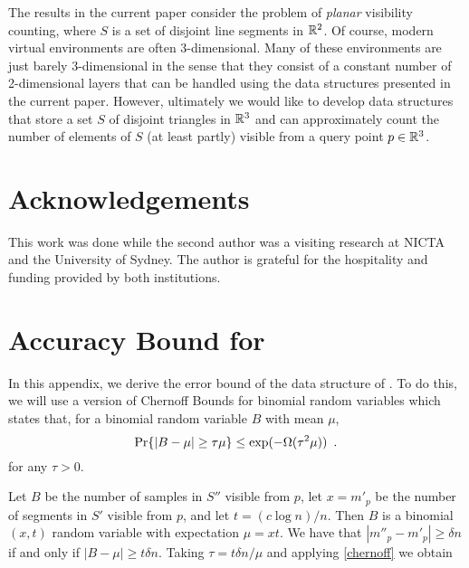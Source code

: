 \documentclass{patmorin}
\begin{document}
The results in the current paper consider the problem of \emph{planar}
visibility counting, where $S$ is a set of disjoint line segments in
$\mathbb{R}^2$.  Of course, modern virtual environments are often 3-dimensional.
Many of these environments are just barely 3-dimensional in the sense
that they consist of a constant number of 2-dimensional layers that can
be handled using the data structures presented in the current paper.
However, ultimately we would like to develop data structures that store
a set $S$ of disjoint triangles in $\mathbb{R}^3$ and can approximately count
the number of elements of $S$ (at least partly) visible from a query
point $p\in \mathbb{R}^3$.


\section*{Acknowledgements}

This work was done while the second author was a visiting research at NICTA
and the University of Sydney.  The author is grateful for the hospitality
and funding provided by both institutions.





\appendix

\section{Accuracy Bound for }

In this appendix, we derive the error bound of the data structure of
.  To do this, we will use a version of Chernoff Bounds
for binomial random variables \cite[Appendix~A.1]{as08} which states
that, for a binomial random variable $B$ with mean $\mu$, 
\begin{equation}  
  \Pr\{|B-\mu| \ge \tau\mu\} 
     \le \exp(-\Omega(\tau^2\mu)) \enspace .
  \eqlabel{chernoff}
\end{equation}
for any $\tau > 0$.

Let $B$ be the number of samples in $S''$ visible from $p$, let $x=m'_p$
be the number of segments in $S'$ visible from $p$, and let $t=(c\log
n)/n$.  Then $B$ is a binomial$(x,t)$ random variable with expectation
$\mu = xt$.  We have that $|m''_p-m'_p|\ge \delta n$ if and only if
$|B-\mu|\ge t\delta n$.  Taking $\tau = t\delta n/\mu$ and applying
\eqref{chernoff} we obtain
\end{document}
